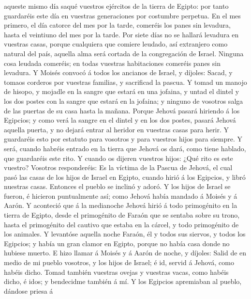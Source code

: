 aqueste mismo día saqué vuestros ejércitos de la tierra de Egipto: por
tanto guardaréis este día en vuestras generaciones por costumbre
perpetua.  En el mes primero, el día catorce del mes por
la tarde, comeréis los panes sin levadura, hasta el veintiuno del mes
por la tarde.  Por siete días no se hallará levadura en
vuestras casas, porque cualquiera que comiere leudado, así extranjero
como natural del país, aquella alma será cortada de la congregación de
Israel.  Ninguna cosa leudada comeréis; en todas vuestras
habitaciones comeréis panes sin levadura.  Y Moisés
convocó á todos los ancianos de Israel, y díjoles: Sacad, y tomaos
corderos por vuestras familias, y sacrificad la pascua. 
Y tomad un manojo de hisopo, y mojadle en la sangre que estará en una
jofaina, y untad el dintel y los dos postes con la sangre que estará en
la jofaina; y ninguno de vosotros salga de las puertas de su casa hasta
la mañana.  Porque Jehová pasará hiriendo á los Egipcios;
y como verá la sangre en el dintel y en los dos postes, pasará Jehová
aquella puerta, y no dejará entrar al heridor en vuestras casas para
herir.  Y guardaréis esto por estatuto para vosotros y
para vuestros hijos para siempre.  Y será, cuando habréis
entrado en la tierra que Jehová os dará, como tiene hablado, que
guardaréis este rito.  Y cuando os dijeren vuestros
hijos: ¿Qué rito es este vuestro?  Vosotros responderéis:
Es la víctima de la Pascua de Jehová, el cual pasó las casas de los
hijos de Israel en Egipto, cuando hirió á los Egipcios, y libró nuestras
casas. Entonces el pueblo se inclinó y adoró.  Y los
hijos de Israel se fueron, é hicieron puntualmente así; como Jehová
había mandado á Moisés y á Aarón.  Y aconteció que á la
medianoche Jehová hirió á todo primogénito en la tierra de Egipto, desde
el primogénito de Faraón que se sentaba sobre su trono, hasta el
primogénito del cautivo que estaba en la cárcel, y todo primogénito de
los animales.  Y levantóse aquella noche Faraón, él y
todos sus siervos, y todos los Egipcios; y había un gran clamor en
Egipto, porque no había casa donde no hubiese muerto.  E
hizo llamar á Moisés y á Aarón de noche, y díjoles: Salid de en medio de
mi pueblo vosotros, y los hijos de Israel; é id, servid á Jehová, como
habéis dicho.  Tomad también vuestras ovejas y vuestras
vacas, como habéis dicho, é idos; y bendecidme también á mí.
 Y los Egipcios apremiaban al pueblo, dándose priesa á
